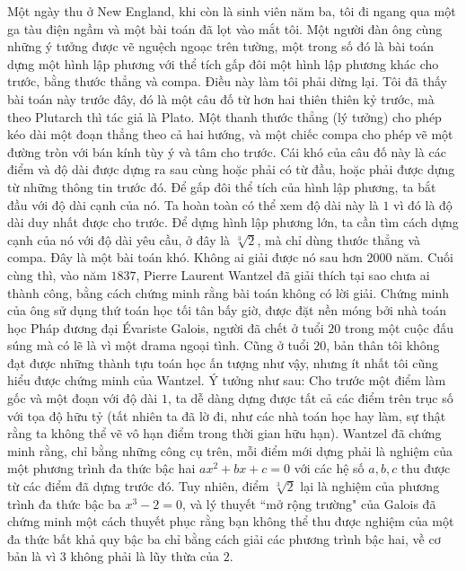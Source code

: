 \vspace*{228pt}

\begin{multicols}{2}	
	Một ngày thu ở New England, khi còn là sinh viên năm ba, tôi đi ngang qua một ga tàu điện ngầm và một bài toán đã lọt vào mắt tôi. Một người đàn ông cùng những ý tưởng được vẽ nguệch ngoạc trên tường, một trong số đó là bài toán dựng một hình lập phương với thể tích gấp đôi một hình lập phương khác cho trước, bằng thước thẳng và compa. 
	\vskip 0.1cm
	Điều này làm tôi phải dừng lại. Tôi đã thấy bài toán này trước đây, đó là một câu đố từ hơn hai thiên thiên kỷ trước, mà theo Plutarch thì tác giả là Plato. Một thanh thước thẳng (lý tưởng) cho phép kéo dài một đoạn thẳng theo cả hai hướng, và một chiếc compa cho phép vẽ một đường tròn với bán kính tùy ý và tâm cho trước. Cái khó của câu đố này là các điểm và độ dài được dựng ra sau cùng hoặc phải có từ đầu, hoặc phải được dựng từ những thông tin trước đó.
	\vskip 0.1cm
	Để gấp đôi thể tích của hình lập phương, ta bắt đầu với độ dài cạnh của nó. Ta hoàn toàn có thể xem độ dài này là $1$ vì đó là độ dài duy nhất được cho trước. Để dựng hình lập phương lớn, ta cần tìm cách dựng cạnh của nó với độ dài yêu cầu, ở đây là $\sqrt[3]{2}$, mà chỉ dùng thước thẳng và compa.
	\vskip 0.1cm
	Đây là một bài toán khó. Không ai giải được nó sau hơn $2000$ năm. Cuối cùng thì, vào năm $1837$, Pierre Laurent Wantzel đã giải thích tại sao chưa ai thành công, bằng cách chứng minh rằng bài toán không có lời giải. Chứng minh của ông sử dụng thứ toán học tối tân bấy giờ, được đặt nền móng bởi nhà toán học Pháp đương đại \'Evariste Galois, người đã chết ở tuổi $20$ trong một cuộc đấu súng mà có lẽ là vì một drama ngoại tình. Cũng ở tuổi $20$, bản thân tôi không đạt được những thành tựu toán học ấn tượng như vậy, nhưng ít nhất tôi cũng hiểu được chứng minh của Wantzel.
	\vskip 0.1cm
	Ý tưởng như sau: Cho trước một điểm làm gốc và một đoạn với độ dài $1$, ta dễ dàng dựng được tất cả các điểm trên trục số với tọa độ hữu tỷ (tất nhiên ta đã lờ đi, như các nhà toán học hay làm, sự thật rằng ta không thể vẽ vô hạn điểm trong thời gian hữu hạn).
	\vskip 0.1cm
	Wantzel đã chứng minh rằng, chỉ bằng những công cụ trên, mỗi điểm mới dựng phải là nghiệm của một phương trình đa thức bậc hai $ax^2 + bx + c = 0$ với các hệ số $a, b, c$ thu được từ các điểm đã dựng trước đó. Tuy nhiên, điểm $\sqrt[3]{2}$ lại là nghiệm của phương trình đa thức bậc ba $x^3 - 2 = 0$, và lý thuyết ``mở rộng trường" của Galois đã chứng minh một cách thuyết phục rằng bạn không thể thu được nghiệm của một đa thức bất khả quy bậc ba chỉ bằng cách giải các phương trình bậc hai, về cơ bản là vì $3$ không phải là lũy thừa của $2$.

\end{multicols}

